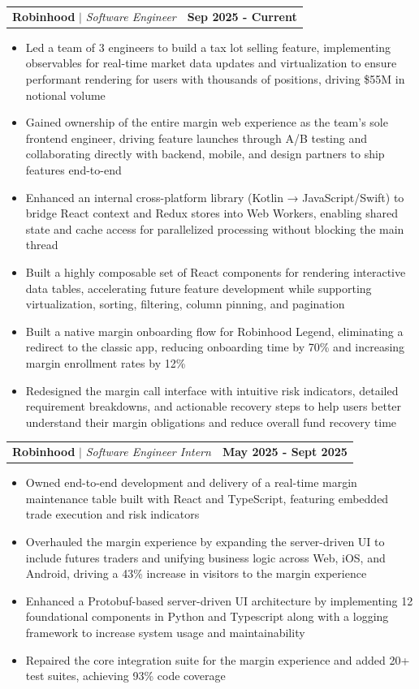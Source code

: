 \documentclass[11pt]{article}
\makeatletter
\newcommand{\resumeItem}[1]{
  \item\small{
    {\fontfamily{lmss}#1 \vspace{-2pt}}
  }
}
\newcommand{\resumeSubheadingUpd}[4]{
  \vspace{2pt}\item
    \begin{tabular*}{0.95\textwidth}[t]{l@{\extracolsep{\fill}}r}
      \hspace{1.2em}\textbf{#1} $|$ \textit{\small#3} & {\bfseries #2}
    \end{tabular*}\vspace{-7pt}
}
\newcommand{\resumeItemListStart}{\begin{itemize}}
\newcommand{\resumeItemListEnd}{\end{itemize}\vspace{-5pt}}
\makeatother
\begin{document}
\resumeSubheadingUpd{Robinhood}{Sep 2025 - Current}{Software Engineer}{Toronto, ON}
\vspace{0.3em}
\resumeItemListStart
\resumeItem{Led a team of 3 engineers to build a tax lot selling feature, implementing observables for real-time market data updates and virtualization to ensure performant rendering for users with thousands of positions, driving \$55M in notional volume}
\resumeItem{Gained ownership of the entire margin web experience as the team's sole frontend engineer, driving feature launches through A/B testing and collaborating directly with backend, mobile, and design partners to ship features end-to-end}
\resumeItem{Enhanced an internal cross-platform library (Kotlin → JavaScript/Swift) to bridge React context and Redux stores into Web Workers, enabling shared state and cache access for parallelized processing without blocking the main thread}
\resumeItem{Built a highly composable set of React components for rendering interactive data tables, accelerating future feature development while supporting virtualization, sorting, filtering, column pinning, and pagination}
\resumeItem{Built a native margin onboarding flow for Robinhood Legend, eliminating a redirect to the classic app, reducing onboarding time by 70\% and increasing margin enrollment rates by 12\%}
\resumeItem{Redesigned the margin call interface with intuitive risk indicators, detailed requirement breakdowns, and actionable recovery steps to help users better understand their margin obligations and reduce overall fund recovery time}
\resumeItemListEnd


\resumeSubheadingUpd{Robinhood}{May 2025 - Sept 2025}{Software Engineer Intern}{Toronto, ON}
\vspace{0.3em}
\resumeItemListStart
\resumeItem{Owned end-to-end development and delivery of a real-time margin maintenance table built with React and TypeScript, featuring embedded trade execution and risk indicators}
\resumeItem{Overhauled the margin experience by expanding the server-driven UI to include futures traders and unifying business logic across Web, iOS, and Android, driving a 43\% increase in visitors to the margin experience}
\resumeItem{Enhanced a Protobuf-based server-driven UI architecture by implementing 12 foundational components in Python and Typescript along with a logging framework to increase system usage and maintainability}
\resumeItem{Repaired the core integration suite for the margin experience and added 20+ test suites, achieving 93\% code coverage}
\resumeItemListEnd
\end{document}
